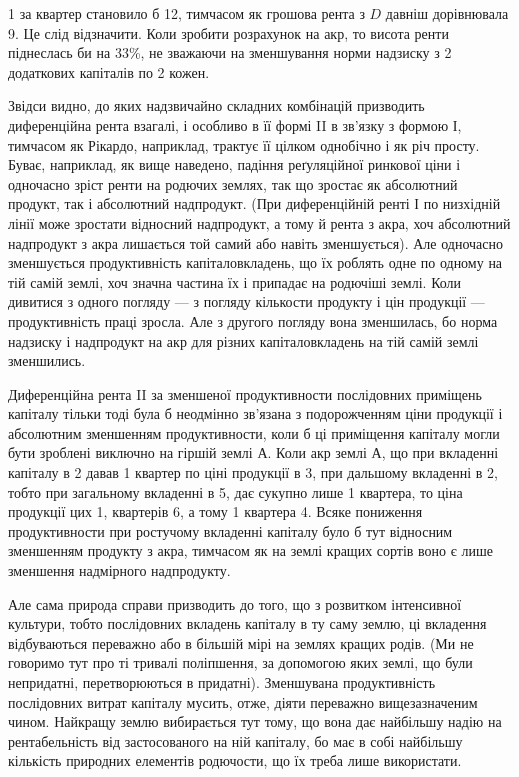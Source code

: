 \parcont{}  %
1 за квартер становило б 12, тимчасом як грошова рента
з $D$ давніш дорівнювала 9. Це слід відзначити. Коли зробити розрахунок
на акр, то висота ренти піднеслась би на 33\%, не зважаючи на зменшування
норми надзиску з 2 додаткових капіталів по 2 кожен.

Звідси видно, до яких надзвичайно складних комбінацій призводить диференційна
рента взагалі, і особливо в її формі II в зв’язку з формою І, тимчасом
як Рікардо, наприклад, трактує її цілком однобічно і як річ просту. Буває, наприклад,
як вище наведено, падіння реґуляційної ринкової ціни і одночасно зріст
ренти на родючих землях, так що зростає як абсолютний продукт, так і
абсолютний надпродукт. (При диференційній ренті І по низхідній лінії може
зростати відносний надпродукт, а тому й рента з акра, хоч абсолютний надпродукт
з акра лишається той самий або навіть зменшується). Але одночасно
зменшується продуктивність капіталовкладень, що їх роблять одне по одному
на тій самій землі, хоч значна частина їх і припадає на родючіші землі. Коли
дивитися з одного погляду — з погляду кількости продукту і цін продукції —
продуктивність праці зросла. Але з другого погляду вона зменшилась, бо норма
надзиску і надпродукт на акр для різних капіталовкладень на тій самій землі
зменшились.

Диференційна рента II за зменшеної продуктивности послідовних приміщень
капіталу тільки тоді була б неодмінно зв’язана з подорожченням ціни продукції
і абсолютним зменшенням продуктивности, коли б ці приміщення капіталу
могли бути зроблені виключно на гіршій землі $А$. Коли акр землі $А$, що
при вкладенні капіталу в 2 давав 1 квартер по ціні продукції
в 3, при дальшому вкладенні в 2, тобто при загальному
вкладенні в 5, дає сукупно лише 1 квартера, то ціна продукції цих
1, квартерів \deq{} 6, а тому 1 квартера \deq{} 4. Всяке пониження
продуктивности при ростучому вкладенні капіталу було б тут відносним зменшенням
продукту з акра, тимчасом як на землі кращих сортів воно є лише
зменшення надмірного надпродукту.

Але сама природа справи призводить до того, що з розвитком інтенсивної
культури, тобто послідовних вкладень капіталу в ту саму землю, ці вкладення
відбуваються переважно або в більшій мірі на землях кращих родів. (Ми не говоримо
тут про ті тривалі поліпшення, за допомогою яких землі, що були непридатні,
перетворюються в придатні). Зменшувана продуктивність послідовних
витрат капіталу мусить, отже, діяти переважно вищезазначеним чином. Найкращу
землю вибирається тут тому, що вона дає найбільшу надію на рентабельність
від застосованого на ній капіталу, бо має в собі найбільшу кількість природних
елементів родючости, що їх треба лише використати.

